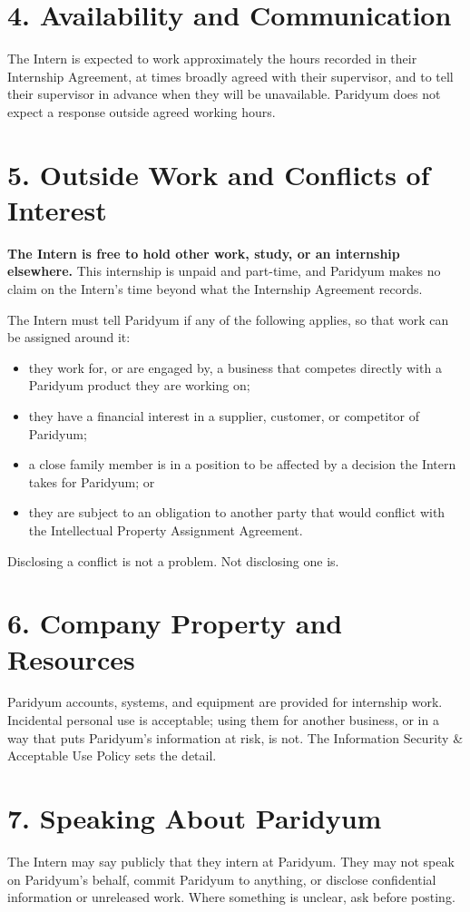 \documentclass{paridyum}
\begin{document}
\section*{4. Availability and Communication}
The Intern is expected to work approximately the hours recorded in their
Internship Agreement, at times broadly agreed with their supervisor, and to
tell their supervisor in advance when they will be unavailable. Paridyum does
not expect a response outside agreed working hours.

\section*{5. Outside Work and Conflicts of Interest}
\textbf{The Intern is free to hold other work, study, or an internship
elsewhere.} This internship is unpaid and part-time, and Paridyum makes no
claim on the Intern's time beyond what the Internship Agreement records.

The Intern must tell Paridyum if any of the following applies, so that work can
be assigned around it:
\begin{itemize}[leftmargin=*, noitemsep]
    \item they work for, or are engaged by, a business that competes directly
          with a Paridyum product they are working on;
    \item they have a financial interest in a supplier, customer, or
          competitor of Paridyum;
    \item a close family member is in a position to be affected by a decision
          the Intern takes for Paridyum; or
    \item they are subject to an obligation to another party that would
          conflict with the Intellectual Property Assignment Agreement.
\end{itemize}
Disclosing a conflict is not a problem. Not disclosing one is.

\section*{6. Company Property and Resources}
Paridyum accounts, systems, and equipment are provided for internship work.
Incidental personal use is acceptable; using them for another business, or in a
way that puts Paridyum's information at risk, is not. The Information Security
\& Acceptable Use Policy sets the detail.

\section*{7. Speaking About Paridyum}
The Intern may say publicly that they intern at Paridyum. They may not speak on
Paridyum's behalf, commit Paridyum to anything, or disclose confidential
information or unreleased work. Where something is unclear, ask before posting.
\end{document}
